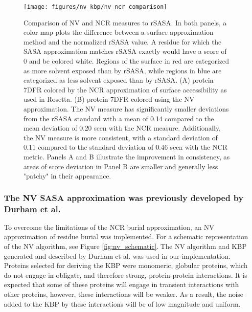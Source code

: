 \begin{figure}
\centering
\texttt{[image: figures/nv\_kbp/nv\_ncr\_comparison]}
\caption{
Comparison of \acs{NV} and \acs{NCR} measures to \acs{rSASA}.
In both panels, a color map plots the difference between a surface approximation method and the normalized \acs{rSASA} value.
A residue for which the \acs{SASA} approximation matches \acs{rSASA} exactly would have a score of 0 and be colored white.
Regions of the surface in red are categorized as more solvent exposed than by \acs{rSASA}, while regions in blue are categorized as less solvent exposed than by \acs{rSASA}.
(A) protein 7DFR colored by the \acs{NCR} approximation of surface accessibility as used in Rosetta.
(B) protein 7DFR colored using the \acs{NV} approximation.
The \acs{NV} measure has significantly smaller deviations from the \acs{rSASA} standard with a mean of 0.14 compared to the mean deviation of 0.20 seen with the \acs{NCR} measure.
Additionally, the \acs{NV} measure is more consistent, with a standard deviation of 0.11 compared to the standard deviation of 0.46 seen with the \acs{NCR} metric.
Panels A and B illustrate the improvement in consistency, as areas of score deviation in Panel B are smaller and generally less "patchy" in their appearance.
}
\label{fig:nv_ncr_comparison}
\end{figure}

\subsubsection{The \acs{NV} \acs{SASA} approximation was previously developed by Durham et al.}
To overcome the limitations of the \ac{NCR} burial approximation, an \ac{NV} approximation of residue burial was implemented.
For a schematic representation of the \ac{NV} algorithm, see Figure \ref{fig:nv_schematic}.
The \ac{NV} algorithm and \ac{KBP} generated and described by Durham et al\citep{Durham:2009kt}.
was used in our implementation.
Proteins selected for deriving the \ac{KBP} were monomeric, globular proteins, which do not engage in obligate, and therefore strong, protein-protein interactions.
It is expected that some of these proteins will engage in transient interactions with other proteins, however, these interactions will be weaker.
As a result, the noise added to the \ac{KBP} by these interactions will be of low magnitude and uniform.

